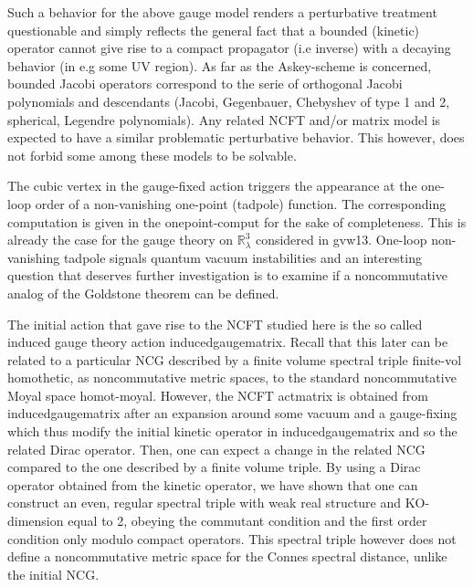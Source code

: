 \documentclass[10pt]{book}
\theoremstyle{break}
\begin{document}
Such a behavior for the above gauge model renders a perturbative treatment questionable and simply reflects the general fact that a bounded (kinetic) operator cannot give rise to a compact propagator (i.e inverse) with a decaying behavior (in e.g some UV region). As far as the Askey-scheme is concerned, bounded Jacobi operators correspond to the serie of orthogonal Jacobi polynomials and descendants (Jacobi, Gegenbauer, Chebyshev of type 1 and 2, spherical, Legendre polynomials). Any related NCFT and/or matrix model is expected to have a similar problematic perturbative behavior. This however, does not forbid some among these models to be solvable.\par

The cubic vertex in the gauge-fixed action triggers the appearance at the one-loop order of a non-vanishing one-point (tadpole) function. The corresponding computation is given in the {onepoint-comput} for the sake of completeness. This is already the case for the gauge theory on $\mathbb{R}^3_\lambda$ considered in {gvw13}. One-loop non-vanishing tadpole signals quantum vacuum instabilities and an interesting question that deserves further investigation is to examine if a noncommutative analog of the Goldstone theorem can be defined.\par

The initial action that gave rise to the NCFT studied here is the so called induced gauge theory action {inducedgaugematrix}. Recall that this later can be related to a particular NCG described by a finite volume spectral triple {finite-vol} homothetic, as noncommutative metric spaces, to the standard noncommutative Moyal space {homot-moyal}. However, the NCFT {actmatrix} is obtained from {inducedgaugematrix} after an expansion around some vacuum and a gauge-fixing which thus modify the initial kinetic operator in {inducedgaugematrix} and so the related Dirac operator. Then, one can expect a change in the related NCG compared to the one described by a finite volume triple. By using a Dirac operator obtained from the kinetic operator, we have shown that one can construct an even, regular spectral triple with weak real structure and KO-dimension equal to 2, obeying the commutant condition and the first order condition only modulo compact operators. This spectral triple however does not define a noncommutative metric space for the Connes spectral distance, unlike the initial NCG.\par
\end{document}
